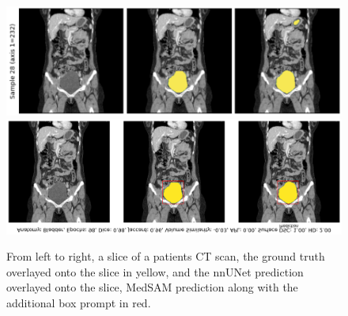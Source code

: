 \documentclass[11pt,twoside]{report}
\begin{document}
\begin{table}[h!]
  \centering
  \caption{Performance of models on the bladder delineation.}
  \label{tab:medsam-bladder-performance}
\end{table}

\begin{figure}[H]
  \centering
 \includegraphics[width=.7\linewidth]{../figures/bladder-nnunet-innacuracy.png}
  \includegraphics[width=.226\linewidth, trim=1000px 45px 0 0px, clip]{../figures/medsam-bladder-prediction.png}
  \caption{From left to right, a slice of a patients CT scan, the ground truth overlayed onto the slice in yellow, and the nnUNet prediction overlayed onto the slice, MedSAM prediction along with the additional box prompt in red.}\label{fig:bladder-nnunet-innacuracy}
\end{figure}%
\end{document}
